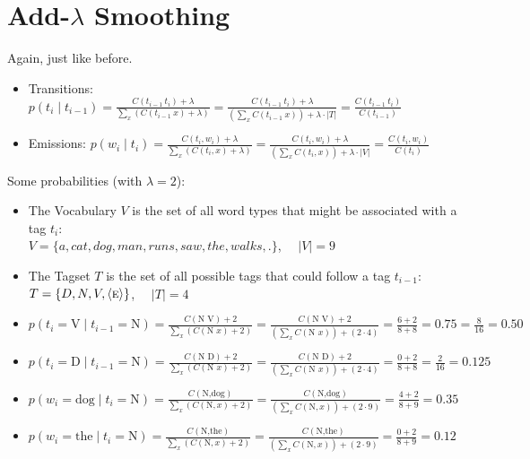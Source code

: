 \documentclass[11pt,letterpaper]{article}
\newcommand{\ngramend}{\ensuremath{\langle \textsc{e} \rangle}}
\newcommand{\tcurr}{\ensuremath{t_i}}
\newcommand{\tprev}{\ensuremath{t_{i-1}}}
\begin{document}
\section{Add-$\lambda$ Smoothing}

Again, just like before.

\begin{itemize}
  \item Transitions: $p(t_i \mid t_{i-1}) 
             = \frac{C(t_{i-1}~t_i)+\lambda}{\sum_x (C(t_{i-1}~x)+\lambda)} 
             = \frac{C(t_{i-1}~t_i)+\lambda}{(\sum_x C(t_{i-1}~x))+\lambda\cdot|T|} 
             = \frac{C(t_{i-1}~t_i)}{C(t_{i-1})}$
  \item Emissions: $p(w_i \mid t_i) 
             = \frac{C(t_i,w_i)+\lambda}{\sum_x (C(t_i,x)+\lambda)} 
             = \frac{C(t_i,w_i)+\lambda}{(\sum_x C(t_i,x))+\lambda\cdot|V|} 
             = \frac{C(t_i,w_i)}{C(t_i)}$
\end{itemize}

Some probabilities (with $\lambda=2$):

\begin{itemize}
  \item The Vocabulary $V$ is the set of all word types that might be associated with a tag \tcurr:   \vspace{2mm} \\
  $V = \{ a, cat, dog, man, runs, saw, the, walks, . \}$, ~~$|V|=9$
  \item The Tagset $T$ is the set of all possible tags that could follow a tag \tprev:   \vspace{2mm} \\
        $T = \{ D, N, V, \ngramend \}$, ~~$|T|=4$
  \\
  \item $p(t_i=\text{V} \mid t_{i-1}=\text{N}) 
     = \frac{C(\text{N V})+2}{\sum_x (C(\text{N } x)+2)} 
     = \frac{C(\text{N V})+2}{(\sum_x C(\text{N } x))+(2 \cdot 4)} 
     = \frac{6+2}{8+8} = 0.75
     = \frac{8}{16} = 0.50$
  \item $p(t_i=\text{D} \mid t_{i-1}=\text{N}) 
     = \frac{C(\text{N D})+2}{\sum_x (C(\text{N } x)+2)} 
     = \frac{C(\text{N D})+2}{(\sum_x C(\text{N } x))+(2 \cdot 4)} 
     = \frac{0+2}{8+8}
     = \frac{2}{16} = 0.125$
  \\
  \item $p(w_i=\text{dog} \mid t_i=\text{N}) 
     = \frac{C(\text{N,dog})}{\sum_x (C(\text{N},x)+2)} 
     = \frac{C(\text{N,dog})}{(\sum_x C(\text{N},x))+(2 \cdot 9)} 
     = \frac{4+2}{8+9}
     = 0.35$
  \item $p(w_i=\text{the} \mid t_i=\text{N}) 
     = \frac{C(\text{N,the})}{\sum_x (C(\text{N},x)+2)} 
     = \frac{C(\text{N,the})}{(\sum_x C(\text{N},x))+(2 \cdot 9)} 
     = \frac{0+2}{8+9} 
     = 0.12$
\end{itemize}
\end{document}
